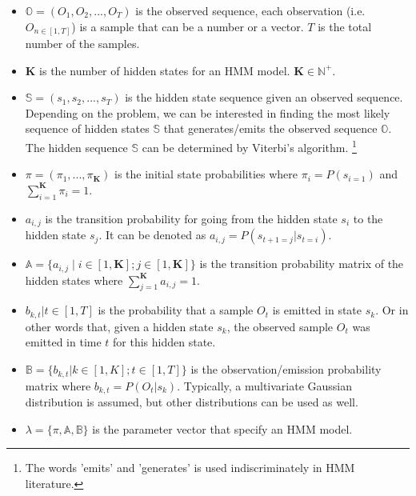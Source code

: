 \begin{itemize}

\item $\mathbb{O} = (O_1,O_2, ...,O_T )$ is the observed sequence, each observation (i.e. $O_{n \in [1,T]} $) is a sample that can be a number or a vector. $T$ is the total number of the samples. 

\item $\mathbf{K}$ is the number of hidden states for an HMM model. $\mathbf{K} \in \mathbb{N}^+$.

\item $\mathbb{S} = (s_1,s_2, ...,s_T )$ is the hidden state sequence given an observed sequence. Depending on the problem, we can be interested in finding the most likely sequence of hidden states $\mathbb{S}$ that generates/emits the observed sequence $\mathbb{O}$. The hidden sequence $\mathbb{S}$ can be determined by Viterbi's algorithm. \footnote{The words 'emits' and 'generates' is used indiscriminately in HMM literature.}

\item $\pi = (\pi_1, ...,\pi_\mathbf{K}) $ is the initial state probabilities where $\pi_i = P(s_{i=1})$ and $\sum_{i=1}^{\mathbf{K}} \pi_i = 1$.

\item $a_{i,j}$ is the transition probability for going from the hidden state $s_i$ to the hidden state $s_j$. It can be denoted as $a_{i,j} = P(s_{t+1=j} |s_{t = i})$. 
 
\item $\mathbb{A} = \{ a_{i,j}  \mid i \in [1,\mathbf{K}]; j \in [1,\mathbf{K}] \}$ is the transition probability matrix of the hidden states where $\sum_{j=1}^{\mathbf{K}} a_{i,j} = 1$.

\item $b_{k,t}  | t \in [1,T]$ is the probability that a sample $O_t$ is emitted in state $s_k$. Or in other words that, given a hidden state $s_k$, the observed sample $O_t$ was emitted in time $t$ for this hidden state. 

\item $\mathbb{B} = \{b_{k,t}  | k \in [1,K]; t \in [1, T] \} $ is the observation/emission probability matrix where $b_{k,t} = P(O_t | s_{k})$. Typically, a multivariate Gaussian distribution is assumed, but other distributions can be used as well.

\item $\lambda = \{\pi, \mathbb{A}, \mathbb{B} \}$ is the parameter vector that specify an HMM model.


\end{itemize}
